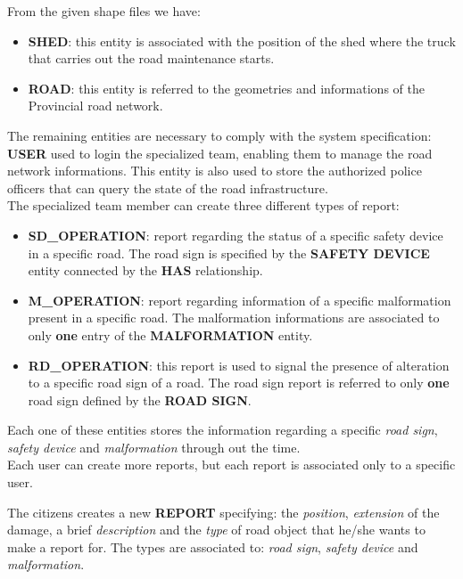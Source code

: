 From the given shape files we have:
 \begin{itemize}
     \item \textbf{SHED}: this entity is associated with the position of the shed where the truck that carries out the road maintenance starts. 
     \item \textbf{ROAD}: this entity is referred to the geometries and informations of the Provincial road network.
 \end{itemize} 
 The remaining entities are necessary to comply with the system specification: \textbf{USER} used to login the specialized team, enabling them to manage the road network informations. This entity is also used to store the authorized police officers that can query the state of the road infrastructure.
 \\
 The specialized team member can create three different types of report:
 \begin{itemize}
     \item \textbf{SD\_OPERATION}: report regarding the status of a specific safety device in a specific road. 
     The road sign is specified by the \textbf{SAFETY DEVICE} entity connected by the \textbf{HAS} relationship.
     \item \textbf{M\_OPERATION}: report regarding information of a specific malformation present in a specific road. The malformation informations are associated to only \textbf{one} entry of the \textbf{MALFORMATION} entity.
     \item \textbf{RD\_OPERATION}: this report is used to signal the presence of alteration to a specific road sign of a road. The road sign report is referred to only \textbf{one} road sign defined by the \textbf{ROAD SIGN}.
 \end{itemize}
 Each one of these entities stores the information regarding a specific \textit{road sign}, \textit{safety device} and \textit{malformation} through out the time.\\
 Each user can create more reports, but each report is associated only to a specific user.

 The citizens creates a new \textbf{REPORT} specifying: the \textit{position}, \textit{extension} of the damage, a brief \textit{description} and the \textit{type} of road object that he/she wants to make a report for. The types are associated to: \textit{road sign}, \textit{safety device} and \textit{malformation}.
 

